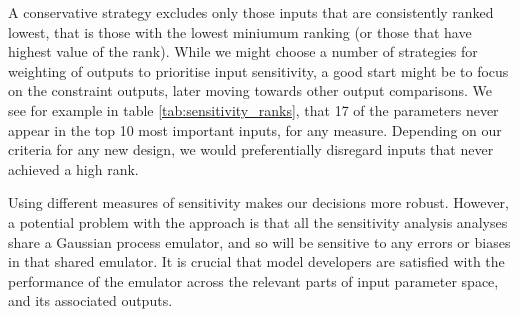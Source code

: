 \documentclass[gmd, manuscript]{copernicus}
\begin{document}
A conservative strategy excludes only those inputs that are consistently ranked lowest, that is those with the lowest miniumum ranking (or those that have highest value of the rank). While we might choose a number of strategies for weighting of outputs to prioritise input sensitivity, a good start might be to focus on the constraint outputs, later moving towards other output comparisons. We see for example in table \ref{tab:sensitivity_ranks}, that 17 of the parameters never appear in the top 10 most important inputs, for any measure. Depending on our criteria for any new design, we would preferentially disregard inputs that never achieved a high rank.

Using different measures of sensitivity makes our decisions more robust. However, a potential problem with the approach is that all the sensitivity analysis analyses share a Gaussian process emulator, and so will be sensitive to any errors or biases in that shared emulator. It is crucial that model developers are satisfied with the performance of the emulator across the relevant parts of input parameter space, and its associated outputs.
\end{document}

